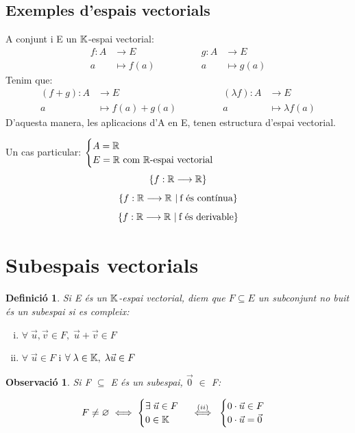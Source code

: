 \documentclass[a4paper, 11pt]{article}
\newtheorem*{definicio}{Definició}
\newtheorem*{obs}{Observació}
\begin{document}
\subsection*{Exemples d'espais vectorials}
A conjunt i E un $\mathbb{K}$-espai vectorial:
\begin{align*}
	f: A & \longrightarrow E  \qquad \qquad &g: A &\longrightarrow E\\
	 a & \longmapsto f(a) \qquad \qquad & a& \longmapsto g(a)
\end{align*}
Tenim que:
\begin{align*}
	(f+g): A & \longrightarrow E  \qquad \qquad &(\lambda f): A &\longrightarrow E \\
	a & \longmapsto f(a)+g(a) \qquad \qquad & a& \longmapsto \lambda f(a)
\end{align*}
D'aquesta manera, les aplicacions d'A en E, tenen estructura d'espai vectorial.

\medskip

Un cas particular:
$\begin{cases}
	A=\mathbb{R} \\
	E=\mathbb{R} \text{ com } \mathbb{R} \text{-espai vectorial}
\end{cases}$
\begin{equation}
	\{f: \mathbb{R} \longrightarrow \mathbb{R}\}
\end{equation}
\begin{equation}
	\{f: \mathbb{R} \longrightarrow \mathbb{R}\ | \: \text{f és contínua}\}
\end{equation}
\begin{equation}
	\{f: \mathbb{R} \longrightarrow \mathbb{R}\ | \: \text{f és derivable}\}
\end{equation}

\section{Subespais vectorials}
\begin{definicio}
	Si E és un $\mathbb{K}$-espai vectorial, diem que $F \subseteq E$ un subconjunt no buit és un subespai si es compleix:
\end{definicio}
\begin{enumerate}[(i)]\label{subespai}
	\item $\forall \; \vec{u}, \vec{v} \in F, \; \vec{u}+\vec{v} \in F$
	\item $\forall \; \vec{u} \in F$ i  $\forall \; \lambda \in \mathbb{K}, \; \lambda\vec{u} \in F $
\end{enumerate}
\begin{obs}
	Si F $\subseteq$ E és un subespai, $\vec{0}$ $\in$ F:
\end{obs}
\begin{equation*}
	F \not = \varnothing 
	\iff 
	\begin{cases}
		\exists \; \vec{u} \in F \\
		0 \in \mathbb{K}
	\end{cases}
	\overset{(ii)}{\iff}
	\;
	\begin{cases}
		0 \cdot \vec{u} \in F \\
		0 \cdot \vec{u} = \vec{0}
	\end{cases}
\end{equation*}
\end{document}
